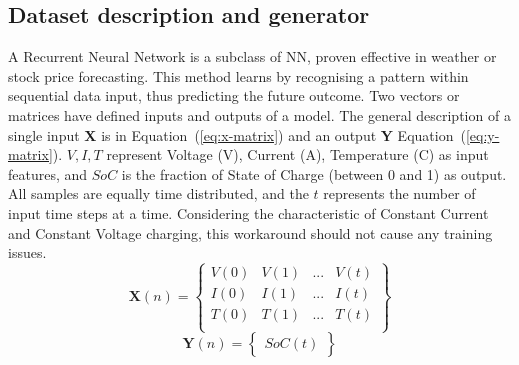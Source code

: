 \subsection{Dataset description and generator} \label{subsec:dataset}
%
A Recurrent Neural Network is a subclass of NN, proven effective in weather or stock price forecasting. %
This method learns by recognising a pattern within sequential data input, thus predicting the future outcome.
Two vectors or matrices have defined inputs and outputs of a model.
The general description of a single input \textbf{X} is in \mbox{Equation~(\ref{eq:x-matrix})} and an output \textbf{Y} \mbox{Equation~(\ref{eq:y-matrix})}.
$V, I, T$ represent Voltage (V), Current (A), Temperature (\textdegree{}C) as input features, and $SoC$ is the fraction of State of Charge (between 0 and 1) as output.
All samples are equally time distributed, and the $t$ represents the number of input time steps at a time.
Considering the characteristic of Constant Current and Constant Voltage charging, this workaround should not cause any training issues.
\begin{equation}
    \textbf{X} \left (n  \right ) =
    \begin{Bmatrix}
        V \left (0  \right ) & V \left (1  \right ) & ... & V \left (t  \right )\\ 
        I \left (0  \right ) & I \left (1  \right ) & ... & I \left (t  \right )\\ 
        T \left (0  \right ) & T \left (1  \right ) & ... & T \left (t  \right )\\
    \end{Bmatrix}
    \label{eq:x-matrix}
\end{equation}
\begin{equation}
    \textbf{Y} \left (n  \right ) =
    \begin{Bmatrix}
        SoC \left (t  \right ) 
    \end{Bmatrix}
    \label{eq:y-matrix}
\end{equation}

